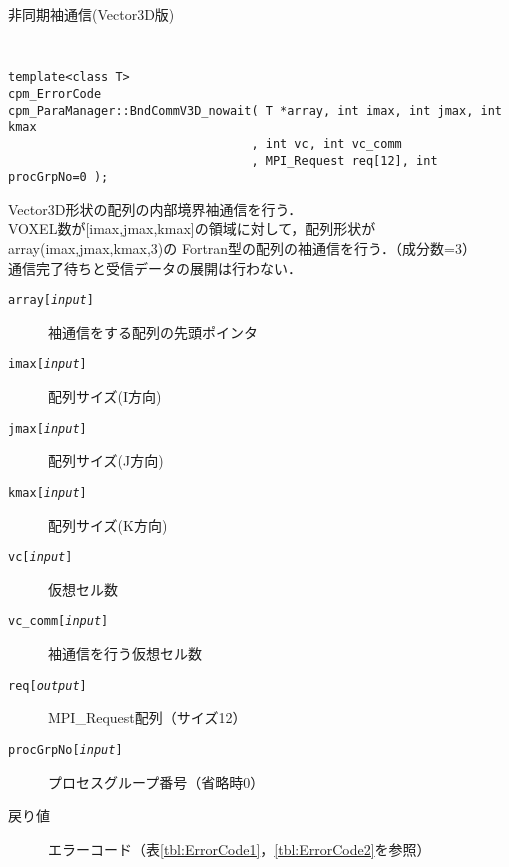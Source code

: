 \begin{spacing}{0.8}
\begin{itembox}[l]{非同期袖通信(Vector3D版)}
{\tt
\begin{verbatim}
template<class T>
cpm_ErrorCode
cpm_ParaManager::BndCommV3D_nowait( T *array, int imax, int jmax, int kmax
                                  , int vc, int vc_comm
                                  , MPI_Request req[12], int procGrpNo=0 );
\end{verbatim}
}
Vector3D形状の配列の内部境界袖通信を行う．\\
VOXEL数が[imax,jmax,kmax]の領域に対して，配列形状がarray(imax,jmax,kmax,3)の
Fortran型の配列の袖通信を行う．（成分数=3）\\
通信完了待ちと受信データの展開は行わない．
\begin{description}
\item[{\tt array[{\it input}]}] 袖通信をする配列の先頭ポインタ
\item[{\tt imax[{\it input}]}] 配列サイズ(I方向)
\item[{\tt jmax[{\it input}]}] 配列サイズ(J方向)
\item[{\tt kmax[{\it input}]}] 配列サイズ(K方向)
\item[{\tt vc[{\it input}]}] 仮想セル数
\item[{\tt vc\_comm[{\it input}]}] 袖通信を行う仮想セル数
\item[{\tt req[{\it output}]}] MPI\_Request配列（サイズ12）
\item[{\tt procGrpNo[{\it input}]}] プロセスグループ番号（省略時0）
\\
\item[戻り値] エラーコード（表\ref{tbl:ErrorCode1}，\ref{tbl:ErrorCode2}を参照）
\end{description}
\end{itembox}\\
\end{spacing}

